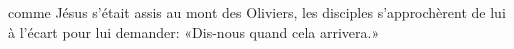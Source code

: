 \encetemps comme Jésus s’était assis au mont des Oliviers,
	les disciples s’approchèrent de lui à l’écart pour lui demander:
	«Dis-nous quand cela arrivera.»
